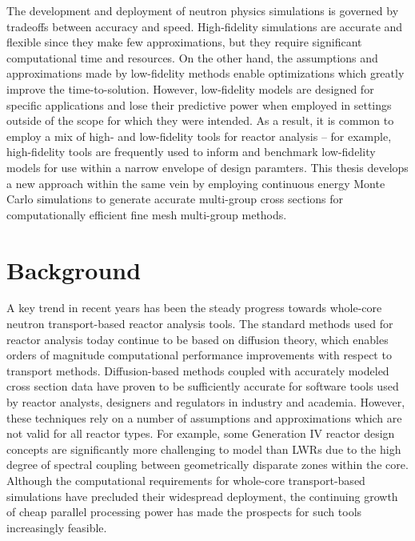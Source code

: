 The development and deployment of neutron physics simulations is governed by tradeoffs between accuracy and speed. High-fidelity simulations are accurate and flexible since they make few approximations, but they require significant computational time and resources. On the other hand, the assumptions and approximations made by low-fidelity methods enable optimizations which greatly improve the time-to-solution. However, low-fidelity models are designed for specific applications and lose their predictive power when employed in settings outside of the scope for which they were intended. As a result, it is common to employ a mix of high- and low-fidelity tools for reactor analysis -- for example, high-fidelity tools are frequently used to inform and benchmark low-fidelity models for use within a narrow envelope of design paramters. This thesis develops a new approach within the same vein by employing continuous energy Monte Carlo simulations to generate accurate multi-group cross sections for computationally efficient fine mesh multi-group methods.


\section{Background}
\label{sec:chap1-background}

A key trend in recent years has been the steady progress towards whole-core neutron transport-based reactor analysis tools. The standard methods used for reactor analysis today continue to be based on diffusion theory, which enables orders of magnitude computational performance improvements with respect to transport methods. Diffusion-based methods coupled with accurately modeled cross section data have proven to be sufficiently accurate for software tools used by reactor analysts, designers and regulators in industry and academia. However, these techniques rely on a number of assumptions and approximations which are not valid for all reactor types. For example, some Generation IV reactor design concepts are significantly more challenging to model than \ac{LWR}s due to the high degree of spectral coupling between geometrically disparate zones within the core. Although the computational requirements for whole-core transport-based simulations have precluded their widespread deployment, the continuing growth of cheap parallel processing power has made the prospects for such tools increasingly feasible.


